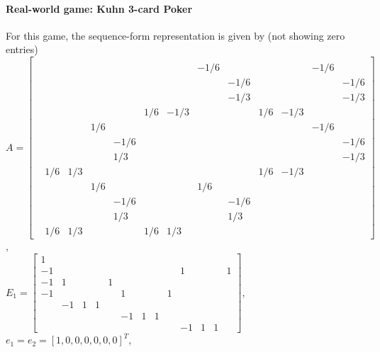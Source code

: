 \documentclass{article} %
\begin{document}
\paragraph{Real-world game: Kuhn 3-card Poker}
For this game, the sequence-form representation is given by (not showing zero entries)\\
$A = \left[\begin{array}{ccccccccccccc}
  &   &   &   &   &   &   &   &   &   &   &   &  \\
  &   &   &   &   &   &   & -1 / 6 &   &   &   & -1 / 6 &  \\
  &   &   &   &   &   &   &   & -1 / 6 &   &   &   & -1 / 6\\
  &   &   &   &   &   &   &   & -1 / 3 &   &   &   & -1 / 3\\
  &   &   &   &   & 1 / 6 & -1 / 3 &   &   & 1 / 6 & -1 / 3 &   &  \\
  &   &   & 1 / 6 &   &   &   &   &   &   &   & -1 / 6 &  \\
  &   &   &   & -1 / 6 &   &   &   &   &   &   &   & -1 / 6\\
  &   &   &   & 1 / 3 &   &   &   &   &   &   &   & -1 / 3\\
  & 1 / 6 & 1 / 3 &   &   &   &   &   &   & 1 / 6 & -1 / 3 &   &  \\
  &   &   & 1 / 6 &   &   &   & 1 / 6 &   &   &   &   &  \\
  &   &   &   & -1 / 6 &   &   &   & -1 / 6 &   &   &   &  \\
  &   &   &   & 1 / 3 &   &   &   & 1 / 3 &   &   &   &  \\
  & 1 / 6 & 1 / 3 &   &   & 1 / 6 & 1 / 3 &   &   &   &   &   &  
\end{array}\right]$,\\
$E_1 = \left[\begin{array}{ccccccccccccc}
1 &   &   &   &   &   &   &   &   &   &   &   &  \\
-1 &   &   &   &   &   &   &   &   & 1 &   &   & 1\\
-1 & 1 &   &   & 1 &   &   &   &   &   &   &   &  \\
-1 &   &   &   &   & 1 &   &   & 1 &   &   &   &  \\
  & -1 & 1 & 1 &   &   &   &   &   &   &   &   &  \\
  &   &   &   &   & -1 & 1 & 1 &   &   &   &   &  \\
  &   &   &   &   &   &   &   &   & -1 & 1 & 1 &  
\end{array}\right]$, $e_1 = e_2 = [1, 0, 0, 0, 0, 0, 0]^T$,\\
\end{document}
